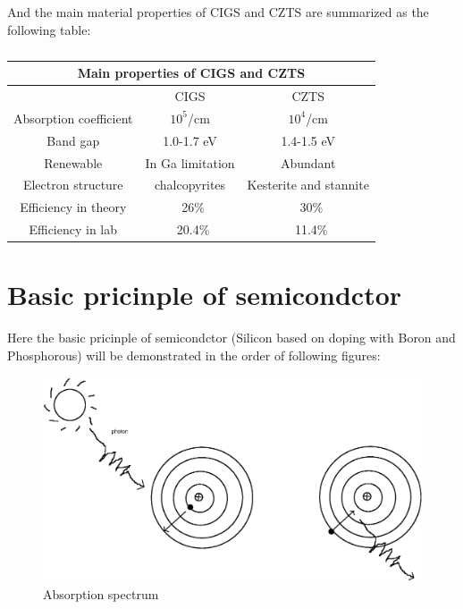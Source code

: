 \documentclass[a4paper, 12pt, titlepage,oneside,drop]{kthesis}
\begin{document}

And the main material properties of CIGS and CZTS are summarized as the following table:

\begin{table}[H]
\begin{center}
\begin{tabular}{|c|c|c|}
  \hline
  \multicolumn{3}{|c|}{Main properties of CIGS and CZTS} \\
  \hline
   $ $ & CIGS & CZTS \\ \hline
   Absorption coefficient& $10^5$/cm & $10^4$/cm  \\ 
   Band gap& 1.0-1.7 eV & 1.4-1.5 eV   \\ 
   Renewable& In Ga limitation & Abundant   \\ 
   Electron structure& chalcopyrites  & Kesterite and stannite\\ 
   Efficiency in theory& ~26\% & ~30\%   \\ 
   Efficiency in lab& ~20.4\% & ~11.4\%   \\ 
  \hline
\end{tabular}
\caption{}
\end{center}
\end{table}

\section{Basic pricinple of semicondctor}

Here the basic pricinple of semicondctor (Silicon based on doping with Boron and Phosphorous) will be demonstrated in the order of following figures:


\begin{figure}[H]
\centering
\includegraphics[scale=0.7]{sc1.eps}
\caption{Absorption spectrum}
\label{sc1}
\end{figure}
\end{document}
